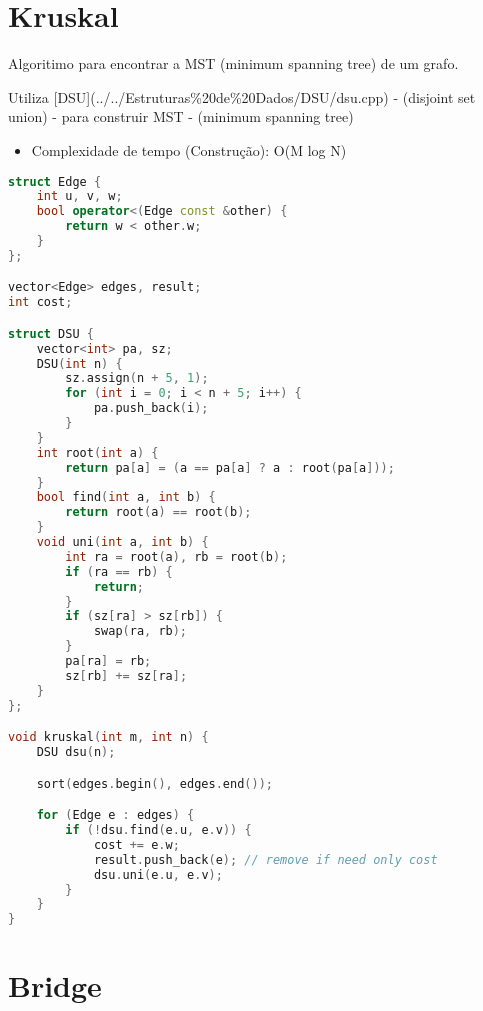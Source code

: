 \documentclass[11pt, a4paper, oneside]{book}
\begin{document}
\hfill

\section{Kruskal}


Algoritimo para encontrar a MST (minimum spanning tree) de um grafo.



Utiliza [DSU](../../Estruturas\%20de\%20Dados/DSU/dsu.cpp) - (disjoint set union) - para construir MST - (minimum spanning tree)



\begin{itemize}
\item Complexidade de tempo (Construção): O(M log N)
\end{itemize}

\hfill

\begin{multicols}{2}
\begin{lstlisting}[language=C++]
struct Edge {
    int u, v, w;
    bool operator<(Edge const &other) {
        return w < other.w;
    }
};

vector<Edge> edges, result;
int cost;

struct DSU {
    vector<int> pa, sz;
    DSU(int n) {
        sz.assign(n + 5, 1);
        for (int i = 0; i < n + 5; i++) {
            pa.push_back(i);
        }
    }
    int root(int a) {
        return pa[a] = (a == pa[a] ? a : root(pa[a]));
    }
    bool find(int a, int b) {
        return root(a) == root(b);
    }
    void uni(int a, int b) {
        int ra = root(a), rb = root(b);
        if (ra == rb) {
            return;
        }
        if (sz[ra] > sz[rb]) {
            swap(ra, rb);
        }
        pa[ra] = rb;
        sz[rb] += sz[ra];
    }
};

void kruskal(int m, int n) {
    DSU dsu(n);

    sort(edges.begin(), edges.end());

    for (Edge e : edges) {
        if (!dsu.find(e.u, e.v)) {
            cost += e.w;
            result.push_back(e); // remove if need only cost
            dsu.uni(e.u, e.v);
        }
    }
}
\end{lstlisting}
\end{multicols}

\hfill

\section{Bridge}
\end{document}
